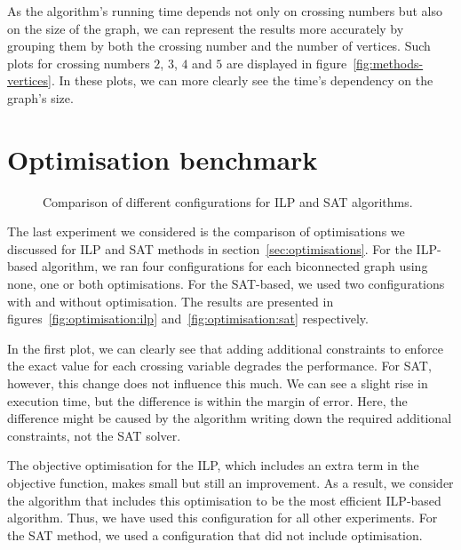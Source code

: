 As the algorithm's running time depends not only on crossing numbers but also on the size of the graph, we can represent the results more accurately by grouping them by both the crossing number and the number of vertices. Such plots for crossing numbers \(2\), \(3\), \(4\) and \(5\) are displayed in figure~\ref{fig:methods-vertices}. In these plots, we can more clearly see the time's dependency on the graph's size.



\section{Optimisation benchmark}

\begin{figure}[tbh]
    \centering
     \hfill
    \captionsetup{subrefformat=parens}
    \caption{Comparison of different configurations for ILP and SAT algorithms.}
    \label{fig:optimisation}
\end{figure}

The last experiment we considered is the comparison of optimisations we discussed for ILP and SAT methods in section~\ref{sec:optimisations}. For the ILP-based algorithm, we ran four configurations for each biconnected graph using none, one or both optimisations. For the SAT-based, we used two configurations with and without optimisation. The results are presented in figures~\ref{fig:optimisation:ilp} and~\ref{fig:optimisation:sat} respectively.

In the first plot, we can clearly see that adding additional constraints to enforce the exact value for each crossing variable degrades the performance. For SAT, however, this change does not influence this much. We can see a slight rise in execution time, but the difference is within the margin of error. Here, the difference might be caused by the algorithm writing down the required additional constraints, not the SAT solver.

The objective optimisation for the ILP, which includes an extra term in the objective function, makes small but still an improvement. As a result, we consider the algorithm that includes this optimisation to be the most efficient ILP-based algorithm. Thus, we have used this configuration for all other experiments. For the SAT method, we used a configuration that did not include optimisation.
